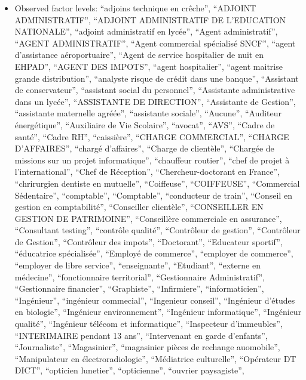 \documentclass[
  letterpaper,
  DIV=11,
  numbers=noendperiod]{scrartcl}
\providecommand{\tightlist}{%
  \setlength{\itemsep}{0pt}\setlength{\parskip}{0pt}}
\begin{document}
\begin{itemize}
\tightlist
\item
  Observed factor levels: ``adjoins technique en crêche'', ``ADJOINT
  ADMINISTRATIF'', ``ADJOINT ADMINISTRATIF DE L'EDUCATION NATIONALE'',
  ``adjoint administratif en lycée'', ``Agent administratif'', ``AGENT
  ADMINISTRATIF'', ``Agent commercial spécialisé SNCF'', ``agent
  d'assistance aéroportuaire'', ``Agent de service hospitalier de nuit
  en EHPAD'', ``AGENT DES IMPOTS'', ``agent hospitalier'', ``agent
  maitrise grande distribution'', ``analyste risque de crédit dans une
  banque'', ``Assistant de conservateur'', ``assistant social du
  personnel'', ``Assistante administrative dans un lycée'', ``ASSISTANTE
  DE DIRECTION'', ``Assistante de Gestion'', ``assistante maternelle
  agréée'', ``assistante sociale'', ``Aucune'', ``Auditeur
  énergétique'', ``Auxiliaire de Vie Scolaire'', ``avocat'', ``AVS'',
  ``Cadre de santé'', ``Cadre RH'', ``caissière'', ``CHARGE
  COMMERCIAL'', ``CHARGE D'AFFAIRES'', ``chargé d'affaires'', ``Charge
  de clientèle'', ``Chargée de missions sur un projet informatique'',
  ``chauffeur routier'', ``chef de projet à l'international'', ``Chef de
  Réception'', ``Chercheur-doctorant en France'', ``chrirurgien dentiste
  en mutuelle'', ``Coiffeuse'', ``COIFFEUSE'', ``Commercial
  Sédentaire'', ``comptable'', ``Comptable'', ``conducteur de train'',
  ``Conseil en gestion en comptabilité'', ``Conseiller clientèle'',
  ``CONSEILLER EN GESTION DE PATRIMOINE'', ``Conseillère commerciale en
  assurance'', ``Consultant testing'', ``contrôle qualité'',
  ``Contrôleur de gestion'', ``Contrôleur de Gestion'', ``Contrôleur des
  impots'', ``Doctorant'', ``Educateur sportif'', ``éducatrice
  spécialisée'', ``Employé de commerce'', ``employer de commerce'',
  ``employer de libre service'', ``enseignante'', ``Etudiant'',
  ``externe en médecine'', ``fonctionnaire territorial'', ``Gestionnaire
  Administratif'', ``Gestionnaire financier'', ``Graphiste'',
  ``Infirmiere'', ``informaticien'', ``Ingénieur'', ``ingénieur
  commecial'', ``Ingenieur conseil'', ``Ingénieur d'études en
  biologie'', ``Ingénieur environnement'', ``Ingénieur informatique'',
  ``Ingénieur qualité'', ``Ingénieur télécom et informatique'',
  ``Inspecteur d'immeubles'', ``INTERIMAIRE pendant 13 ans'',
  ``Intervenant en garde d'enfants'', ``Journaliste'', ``Magasinier'',
  ``magasinier pièces de rechange auomobile'', ``Manipulateur en
  électroradiologie'', ``Médiatrice culturelle'', ``Opérateur DT DICT'',
  ``opticien lunetier'', ``opticienne'', ``ouvrier paysagiste'',

\end{itemize}
\end{document}
